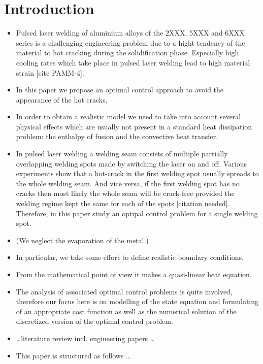 
\section{Introduction}
\label{sec:introduction}

\begin{itemize}
	\item Pulsed laser welding of aluminium alloys of the 2XXX, 5XXX and 6XXX series is a challenging engineering problem due to a hight tendency of the material to hot cracking during the solidification phase. Especially high cooling rates which take place in pulsed laser welding lead to high material strain [cite PAMM-4].
	\item In this paper we propose an optimal control approach to avoid the appearance of the hot cracks.
	\item In order to obtain a realistic model we need to take into account several physical effects which are usually not present in a standard heat dissipation problem: the enthalpy of fusion and the convective heat transfer.
	\item In pulsed laser welding a welding seam consists of multiple partially overlapping welding spots made by switching the laser on and off. Various experiments show that a hot-crack in the first welding spot usually spreads to the whole welding seam. And vice versa, if the first welding spot has no cracks then most likely the whole seam will be crack-free provided the welding regime kept the same for each of the spots [citation needed]. Therefore, in this paper study an optipal control problem for a single welding spot.
	\item (We neglect the evaporation of the metal.)
	\item In particular, we take some effort to define realistic boundary conditions.
	\item From the mathematical point of view it makes a quasi-linear heat equation.
	\item The analysis of associated optimal control problems is quite involved, therefore our focus here is on modelling of the state equation and formulating of an appropriate cost function as well as the numerical solution of the discretized version of the optimal control problem.
	\item \ldots literature review incl. engineering papers \ldots
	\item This paper is structured as follows \ldots
\end{itemize}


